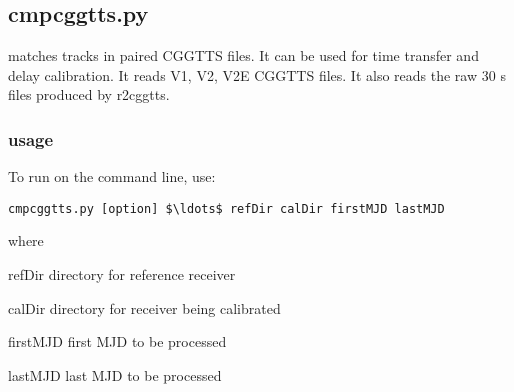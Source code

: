 \subsection{cmpcggtts.py}

\hypertarget{h:cmpcggtts}{}

 matches tracks in paired CGGTTS files. 
It can be used for time transfer and delay calibration. 
It reads V1, V2, V2E CGGTTS files. 
It also reads the raw 30 s files produced by r2cggtts.

\subsubsection{usage}

To run  on the command line, use:
\begin{lstlisting}[mathescape=true]
cmpcggtts.py [option] $\ldots$ refDir calDir firstMJD lastMJD
\end{lstlisting}
where\\

\begin{description*}
\item[refDir]    directory for reference receiver
\item[calDir]    directory for receiver being calibrated 
\item[firstMJD]  first MJD to be processed
\item[lastMJD]   last MJD  to be processed
\end{description*}

